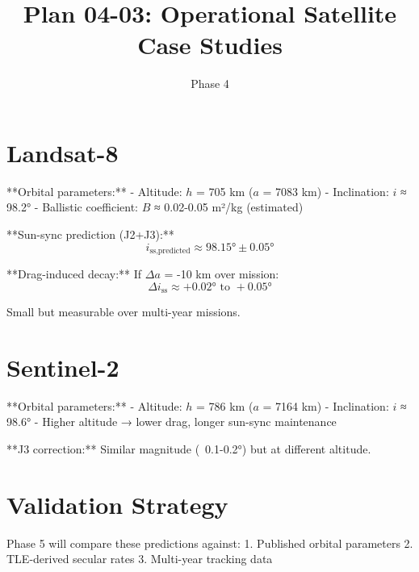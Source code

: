 \documentclass[11pt]{article}
\title{Plan 04-03: Operational Satellite Case Studies}
\date{Phase 4}
\begin{document}
\maketitle

\section{Landsat-8}

**Orbital parameters:**
- Altitude: $h$ = 705 km ($a$ = 7083 km)
- Inclination: $i$ ≈ 98.2°
- Ballistic coefficient: $B$ ≈ 0.02-0.05 m²/kg (estimated)

**Sun-sync prediction (J2+J3):**
$$i_{\text{ss,predicted}} \approx 98.15\text{°} \pm 0.05\text{°}$$

**Drag-induced decay:** If $\Delta a$ = -10 km over mission:
$$\Delta i_{\text{ss}} \approx +0.02\text{° to } +0.05\text{°}$$

Small but measurable over multi-year missions.

\section{Sentinel-2}

**Orbital parameters:**
- Altitude: $h$ = 786 km ($a$ = 7164 km)
- Inclination: $i$ ≈ 98.6°
- Higher altitude → lower drag, longer sun-sync maintenance

**J3 correction:** Similar magnitude (~0.1-0.2°) but at different altitude.

\section{Validation Strategy}

Phase 5 will compare these predictions against:
1. Published orbital parameters
2. TLE-derived secular rates
3. Multi-year tracking data
\end{document}
